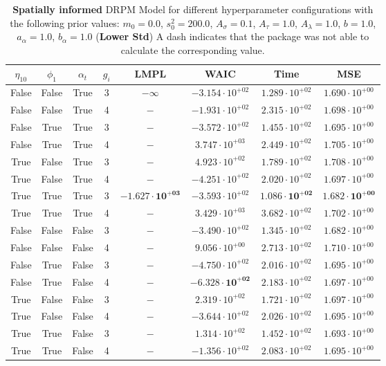 \documentclass[12pt,a4paper]{article}
\begin{document}
\begin{table}
\centering\begin{tabular}{cccccccc}
\toprule
$\eta_{10}$ & $\phi_1$ & $\alpha_t$ & $g_i$ & LMPL & WAIC & Time & MSE \\
\midrule
False & False & True & 3 & $-\infty$ & $-3.154 \cdot 10^{+02}$ & $1.289 \cdot 10^{+02}$ & $1.690 \cdot 10^{+00}$ \\
False & False & True & 4 & $-$ & $-1.931 \cdot 10^{+02}$ & $2.315 \cdot 10^{+02}$ & $1.698 \cdot 10^{+00}$ \\
False & True & True & 3 & $-$ & $-3.572 \cdot 10^{+02}$ & $1.455 \cdot 10^{+02}$ & $1.695 \cdot 10^{+00}$ \\
False & True & True & 4 & $-$ & $3.747 \cdot 10^{+03}$ & $2.449 \cdot 10^{+02}$ & $1.705 \cdot 10^{+00}$ \\
True & False & True & 3 & $-$ & $4.923 \cdot 10^{+02}$ & $1.789 \cdot 10^{+02}$ & $1.708 \cdot 10^{+00}$ \\
True & False & True & 4 & $-$ & $-4.251 \cdot 10^{+02}$ & $2.020 \cdot 10^{+02}$ & $1.697 \cdot 10^{+00}$ \\
True & True & True & 3 & $\mathbf{-1.627 \cdot 10^{+03}}$ & $-3.593 \cdot 10^{+02}$ & $\mathbf{1.086 \cdot 10^{+02}}$ & $\mathbf{1.682 \cdot 10^{+00}}$ \\
True & True & True & 4 & $-$ & $3.429 \cdot 10^{+03}$ & $3.682 \cdot 10^{+02}$ & $1.702 \cdot 10^{+00}$ \\
False & False & False & 3 & $-$ & $-3.490 \cdot 10^{+02}$ & $1.345 \cdot 10^{+02}$ & $1.682 \cdot 10^{+00}$ \\
False & False & False & 4 & $-$ & $9.056 \cdot 10^{+00}$ & $2.713 \cdot 10^{+02}$ & $1.710 \cdot 10^{+00}$ \\
False & True & False & 3 & $-$ & $-4.750 \cdot 10^{+02}$ & $2.016 \cdot 10^{+02}$ & $1.695 \cdot 10^{+00}$ \\
False & True & False & 4 & $-$ & $\mathbf{-6.328 \cdot 10^{+02}}$ & $2.183 \cdot 10^{+02}$ & $1.697 \cdot 10^{+00}$ \\
True & False & False & 3 & $-$ & $2.319 \cdot 10^{+02}$ & $1.721 \cdot 10^{+02}$ & $1.697 \cdot 10^{+00}$ \\
True & False & False & 4 & $-$ & $-3.644 \cdot 10^{+02}$ & $2.026 \cdot 10^{+02}$ & $1.695 \cdot 10^{+00}$ \\
True & True & False & 3 & $-$ & $1.314 \cdot 10^{+02}$ & $1.452 \cdot 10^{+02}$ & $1.693 \cdot 10^{+00}$ \\
True & True & False & 4 & $-$ & $-1.356 \cdot 10^{+02}$ & $2.083 \cdot 10^{+02}$ & $1.695 \cdot 10^{+00}$ \\
\bottomrule
\end{tabular}
\caption{\textbf{Spatially informed} DRPM Model for different hyperparameter configurations with the following prior values: $m_0 = 0.0$, $s_0^2 
= 200.0$, $A_\sigma = 0.1$, $A_\tau = 1.0$, $A_\lambda = 1.0$, $b = 1.0$, $a_\alpha = 1.0$, $b_\alpha = 1.0$ (\textbf{Lower Std})
A dash indicates that the package was not able to calculate the corresponding value.}
\label{tab:DRPMExtensionLowerStd}
\end{table}
\end{document}
